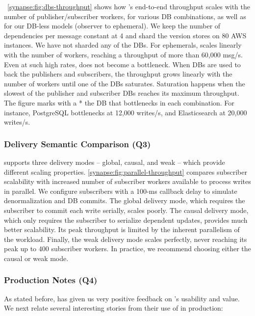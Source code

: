 \F~\ref{synapse:fig:dbs-throughput} shows how \synapse's end-to-end throughput scales
with the number of publisher/subscriber workers, for various DB
combinations, as well as for our
DB-less models (observer to ephemeral). We keep the number of dependencies per
message constant at 4 and shard the version stores on 80 AWS instances. We have not sharded
any of the DBs. For ephemerals, \synapse scales linearly with the number of
workers, reaching a throughput of more than 60,000 msg/s. Even at such high
rates, \synapse does not become a bottleneck.  When DBs are used to
back the publishers and subscribers, the throughput grows linearly with the
number of workers until one of the DBs saturates. Saturation happens when the
slowest of the publisher and subscriber DBs reaches its maximum throughput. The
figure marks with a * the DB that bottlenecks in each combination. For
instance, PostgreSQL bottlenecks at 12,000 writes/s, and Elasticsearch at
20,000 writes/s.

\subsubsection{Delivery Semantic Comparison (Q3)}
\label{synapse:sec:evaluation:delivery}

\synapse supports three delivery modes -- global, causal, and weak -- which
provide different scaling properties.
\F\ref{synapse:fig:parallel-throughput} compares subscriber scalability with 
increased number of subscriber workers available to process writes in parallel.
We configure subscribers with a 100-ms callback delay to simulate
denormalization and DB commits.  The global delivery mode, which requires the
subscriber to commit each write serially, scales poorly.  The causal
delivery mode, which only requires the subscriber to serialize dependent
updates, provides much better scalability.  Its peak throughput is limited by
the inherent parallelism of the workload.  Finally, the weak delivery mode
scales perfectly, never reaching its peak up to 400 subscriber workers.
In practice, we recommend choosing either the causal or weak mode.

\subsubsection{Production Notes (Q4)}
\label{synapse:sec:eval:ease-of-use}

As stated before, \crowdtap has given us very positive feedback on \synapse's
usability and value.  We next relate several interesting stories from
their use of \synapse in production:


